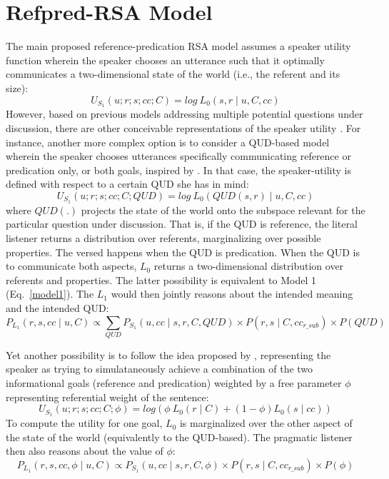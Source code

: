 \section{Refpred-RSA Model}
The main proposed reference-predication RSA model assumes a speaker utility function wherein the speaker chooses an utterance such that it optimally communicates a two-dimensional state of the world (i.e., the referent and its size):
\begin{equation*}
\label{model1}
U_{S_1} (u; r; s; cc; C) = log \: L_0 (s, r \mid u, C, cc) 
\end{equation*}
However, based on previous models addressing multiple potential questions under discussion, there are other conceivable representations of the speaker utility \parencite[cf.][]{kao2014nonliteral, yoon2016talking}. For instance, another more complex option is to consider a QUD-based model wherein the speaker chooses utterances specifically communicating reference or predication only, or both goals, inspired by \textcite{kao2014nonliteral}. In that case, the speaker-utility is defined with respect to a certain QUD she has in mind:
\begin{equation*}
U_{S_1} (u; r; s; cc; C; QUD) = log \: L_0(QUD(s, r) \mid u, C, cc)
\end{equation*} 
where $QUD(.)$ projects the state of the world onto the subspace relevant for the particular question under discussion. That is, if the QUD is reference, the literal listener returns a distribution over referents, marginalizing over possible properties. The versed happens when the QUD is predication. When the QUD is to communicate both aspects, $L_0$ returns a two-dimensional distribution over referents and properties. The latter possibility is equivalent to Model 1 (Eq.~\ref{model1}). The $L_1$ would then jointly reasons about the intended meaning and the intended QUD:
\begin{equation*}
P_{L_1} (r, s, cc \mid u, C) \propto \sum_{QUD} P_{S_1} (u, cc \mid s, r, C, QUD) \times P(r, s \mid C, cc_{r\_sub}) \times P(QUD)
\end{equation*} 

Yet another possibility is to follow the idea proposed by \textcite{yoon2016talking}, representing the speaker as trying to simulataneously achieve a combination of the two informational goals (reference and predication) weighted by a free parameter $\phi$ representing referential weight of the sentence:
\begin{equation*}
U_{S_1} (u; r; s; cc; C; \phi) = log(\phi \: L_0(r \mid C) + (1 - \phi) L_0(s \mid cc))
\end{equation*} 
To compute the utility for one goal, $L_0$ is marginalized over the other aspect of the state of the world (equivalently to the QUD-based). The pragmatic listener then also reasons about the value of $\phi$:
\begin{equation*}
P_{L_1} (r, s, cc, \phi \mid u, C) \propto P_{S_1} (u, cc \mid s, r, C, \phi) \times P(r, s \mid C, cc_{r\_sub}) \times P(\phi)
\end{equation*} 

